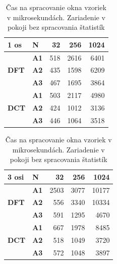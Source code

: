 \begin{table}[h]
\def\arraystretch{1.25}
\begin{tabular}{|l|l|r|r|r|}
\hline
\textbf{1 os}                 & \textbf{N}  & \textbf{32} & \textbf{256} & \textbf{1024} \\ \hline
\multirow{3}{*}{\textbf{DFT}} & \textbf{A1} & 518         & 2616         & 6401          \\ \cline{2-5} 
                              & \textbf{A2} & 435         & 1598         & 6209          \\ \cline{2-5} 
                              & \textbf{A3} & 467         & 1695         & 3864          \\ \hline
\multirow{3}{*}{\textbf{DCT}} & \textbf{A1} & 503         & 2117         & 4980          \\ \cline{2-5} 
                              & \textbf{A2} & 424         & 1012         & 3136          \\ \cline{2-5} 
                              & \textbf{A3} & 446         & 1064         & 3518          \\ \hline
\end{tabular}
\hfill
\begin{tabular}{|l|l|r|r|r|}
\hline
\textbf{3 osi}                 & \textbf{N}  & \textbf{32} & \textbf{256} & \textbf{1024} \\ \hline
\multirow{3}{*}{\textbf{DFT}} & \textbf{A1} & 2503        & 3077         & 10177         \\ \cline{2-5} 
                              & \textbf{A2} & 556         & 3340         & 10334         \\ \cline{2-5} 
                              & \textbf{A3} & 591         & 1295         & 4670          \\ \hline
\multirow{3}{*}{\textbf{DCT}} & \textbf{A1} & 667         & 1978         & 8485          \\ \cline{2-5} 
                              & \textbf{A2} & 518         & 1049         & 3720          \\ \cline{2-5} 
                              & \textbf{A3} & 572         & 1048         & 3897          \\ \hline
\end{tabular}
\caption{Čas na spracovanie okna vzoriek v mikrosekundách. Zariadenie v pokoji bez spracovania štatistík}
\end{table}


